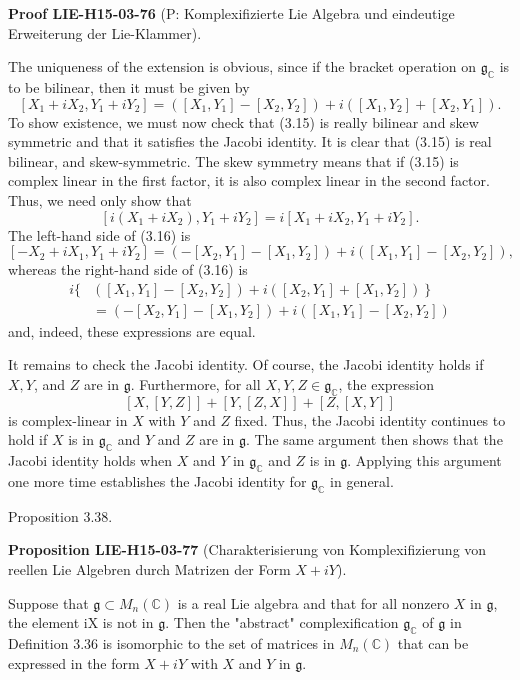 \documentclass[10pt, letterpaper]{article}
\newcommand{\CustomHeading}[3]{%
  \par\medskip\noindent%
  \textbf{#1 #2} \textnormal{(#3)}.\enskip%
}
\newenvironment{PROP}[2]{\begin{unitbox}\CustomHeading{Proposition}{#1}{#2}}{\end{unitbox}}
\newenvironment{PROOF}[2]{\begin{unitbox}\CustomHeading{Proof}{#1}{#2}}{\end{unitbox}}
\begin{document}
\begin{PROOF}{LIE-H15-03-76}{P: Komplexifizierte Lie Algebra und eindeutige Erweiterung der Lie-Klammer}
The uniqueness of the extension is obvious, since if the bracket operation on $\mathfrak{g}_{\mathbb{C}}$ is to be bilinear, then it must be given by
$$
\left[X_{1}+i X_{2}, Y_{1}+i Y_{2}\right]=\left(\left[X_{1}, Y_{1}\right]-\left[X_{2}, Y_{2}\right]\right)+i\left(\left[X_{1}, Y_{2}\right]+\left[X_{2}, Y_{1}\right]\right) .
$$
To show existence, we must now check that (3.15) is really bilinear and skew symmetric and that it satisfies the Jacobi identity. It is clear that (3.15) is real bilinear, and skew-symmetric. The skew symmetry means that if (3.15) is complex linear in the first factor, it is also complex linear in the second factor. Thus, we need only show that
$$
\left[i\left(X_{1}+i X_{2}\right), Y_{1}+i Y_{2}\right]=i\left[X_{1}+i X_{2}, Y_{1}+i Y_{2}\right] .
$$
The left-hand side of (3.16) is
$$
\left[-X_{2}+i X_{1}, Y_{1}+i Y_{2}\right]=\left(-\left[X_{2}, Y_{1}\right]-\left[X_{1}, Y_{2}\right]\right)+i\left(\left[X_{1}, Y_{1}\right]-\left[X_{2}, Y_{2}\right]\right),
$$
whereas the right-hand side of (3.16) is
$$
\begin{aligned}
i\{ & \left.\left(\left[X_{1}, Y_{1}\right]-\left[X_{2}, Y_{2}\right]\right)+i\left(\left[X_{2}, Y_{1}\right]+\left[X_{1}, Y_{2}\right]\right)\right\} \\
& =\left(-\left[X_{2}, Y_{1}\right]-\left[X_{1}, Y_{2}\right]\right)+i\left(\left[X_{1}, Y_{1}\right]-\left[X_{2}, Y_{2}\right]\right)
\end{aligned}
$$
and, indeed, these expressions are equal.

It remains to check the Jacobi identity. Of course, the Jacobi identity holds if $X, Y$, and $Z$ are in $\mathfrak{g}$. Furthermore, for all $X, Y, Z \in \mathfrak{g}_{\mathbb{C}}$, the expression
$$
[X,[Y, Z]]+[Y,[Z, X]]+[Z,[X, Y]]
$$
is complex-linear in $X$ with $Y$ and $Z$ fixed. Thus, the Jacobi identity continues to hold if $X$ is in $\mathfrak{g}_{\mathbb{C}}$ and $Y$ and $Z$ are in $\mathfrak{g}$. The same argument then shows that the Jacobi identity holds when $X$ and $Y$ in $\mathfrak{g}_{\mathbb{C}}$ and $Z$ is in $\mathfrak{g}$. Applying this argument one more time establishes the Jacobi identity for $\mathfrak{g}_{\mathbb{C}}$ in general.
\end{PROOF}



Proposition 3.38. 

\begin{PROP}{LIE-H15-03-77}{Charakterisierung von Komplexifizierung von reellen Lie Algebren durch Matrizen der Form $X+iY$}
Suppose that $\mathfrak{g} \subset M_{n}(\mathbb{C})$ is a real Lie algebra and that for all nonzero $X$ in $\mathfrak{g}$, the element iX is not in $\mathfrak{g}$. Then the "abstract" complexification $\mathfrak{g}_{\mathbb{C}}$ of $\mathfrak{g}$ in Definition 3.36 is isomorphic to the set of matrices in $M_{n}(\mathbb{C})$ that can be expressed in the form $X+i Y$ with $X$ and $Y$ in $\mathfrak{g}$.
\end{PROP}
\end{document}
